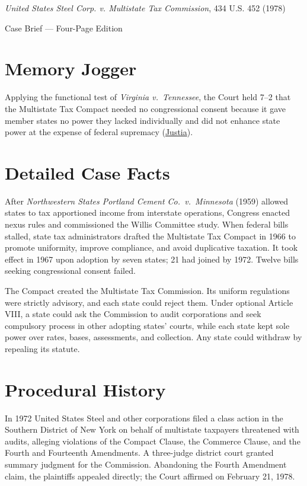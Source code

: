 \documentclass[12pt]{article}
\begin{document}
\begin{center}
{\LARGE \textit{United States Steel Corp. v. Multistate Tax Commission}, 434 U.S. 452 (1978)\par}
\vspace{0.8em}
{\large Case Brief --- Four-Page Edition\par}
\end{center}
\vspace{1em}

\section{Memory Jogger}

Applying the functional test of \textit{Virginia v.\ Tennessee}, the Court held 7--2 that the Multistate Tax Compact needed no congressional consent because it gave member states no power they lacked individually and did not enhance state power at the expense of federal supremacy (\href{https://supreme.justia.com/cases/federal/us/434/452/}{Justia}).

\section{Detailed Case Facts}

After \textit{Northwestern States Portland Cement Co.\ v.\ Minnesota} (1959) allowed states to tax apportioned income from interstate operations, Congress enacted nexus rules and commissioned the Willis Committee study. When federal bills stalled, state tax administrators drafted the Multistate Tax Compact in 1966 to promote uniformity, improve compliance, and avoid duplicative taxation. It took effect in 1967 upon adoption by seven states; 21 had joined by 1972. Twelve bills seeking congressional consent failed.

The Compact created the Multistate Tax Commission. Its uniform regulations were strictly advisory, and each state could reject them. Under optional Article VIII, a state could ask the Commission to audit corporations and seek compulsory process in other adopting states' courts, while each state kept sole power over rates, bases, assessments, and collection. Any state could withdraw by repealing its statute.

\section{Procedural History}

In 1972 United States Steel and other corporations filed a class action in the Southern District of New York on behalf of multistate taxpayers threatened with audits, alleging violations of the Compact Clause, the Commerce Clause, and the Fourth and Fourteenth Amendments. A three-judge district court granted summary judgment for the Commission. Abandoning the Fourth Amendment claim, the plaintiffs appealed directly; the Court affirmed on February 21, 1978.
\end{document}
